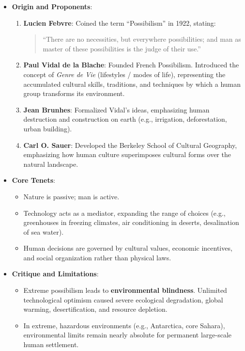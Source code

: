 \documentclass[11pt,a4paper]{article}
\begin{document}
\begin{itemize}[leftmargin=*]
  \item \textbf{Origin and Proponents}:
  \begin{enumerate}
    \item \textbf{Lucien Febvre}: Coined the term ``Possibilism'' in 1922, stating:
    \begin{quote}
      ``There are no necessities, but everywhere possibilities; and man as master of these possibilities is the judge of their use.''
    \end{quote}
    \item \textbf{Paul Vidal de la Blache}: Founded French Possibilism. Introduced the concept of \textit{Genre de Vie} (lifestyles / modes of life), representing the accumulated cultural skills, traditions, and techniques by which a human group transforms its environment.
    \item \textbf{Jean Brunhes}: Formalized Vidal's ideas, emphasizing human destruction and construction on earth (e.g., irrigation, deforestation, urban building).
    \item \textbf{Carl O. Sauer}: Developed the Berkeley School of Cultural Geography, emphasizing how human culture superimposes cultural forms over the natural landscape.
  \end{enumerate}

  \item \textbf{Core Tenets}:
  \begin{itemize}
    \item Nature is passive; man is active.
    \item Technology acts as a mediator, expanding the range of choices (e.g., greenhouses in freezing climates, air conditioning in deserts, desalination of sea water).
    \item Human decisions are governed by cultural values, economic incentives, and social organization rather than physical laws.
  \end{itemize}

  \item \textbf{Critique and Limitations}:
  \begin{itemize}
    \item Extreme possibilism leads to \textbf{environmental blindness}. Unlimited technological optimism caused severe ecological degradation, global warming, desertification, and resource depletion.
    \item In extreme, hazardous environments (e.g., Antarctica, core Sahara), environmental limits remain nearly absolute for permanent large-scale human settlement.
  \end{itemize}
\end{itemize}
\end{document}
